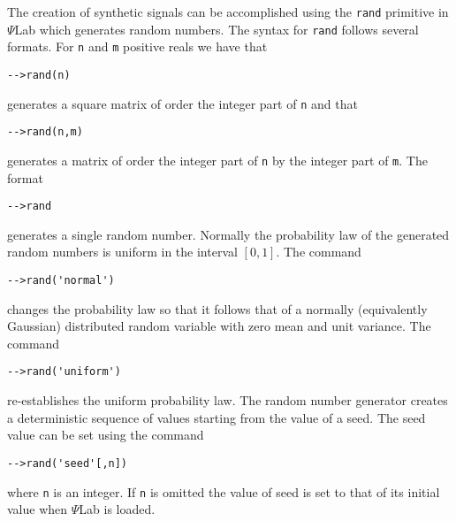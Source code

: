 	The creation of synthetic signals can be accomplished using
the {\tt rand} primitive in $\Psi$Lab which generates random numbers.  
The syntax for {\tt rand} follows
several formats. For {\tt n} and {\tt m} positive reals we have that
\begin{verbatim}
-->rand(n)
\end{verbatim}
generates a square matrix of order the integer part of {\tt n} and that
\begin{verbatim}
-->rand(n,m)
\end{verbatim}
generates a matrix of order the integer part of {\tt n} by the integer
part of {\tt m}.  The format
\begin{verbatim}
-->rand
\end{verbatim}
generates a single random number. Normally the probability law of
the generated random numbers is uniform in the interval $[0,1]$.
The command
\begin{verbatim}
-->rand('normal')
\end{verbatim}
changes the probability law so that it follows that of a normally
(equivalently Gaussian) distributed random variable with zero mean
and unit variance.  The command
\begin{verbatim}
-->rand('uniform')
\end{verbatim}
re-establishes the uniform probability law.  
The random number generator creates a deterministic sequence of values
starting from the value of a seed.  The seed value can be set using
the command
\begin{verbatim}
-->rand('seed'[,n])
\end{verbatim}
where {\tt n} is an integer.  If {\tt n} is omitted the value of
seed is set to that of its initial value when $\Psi$Lab is loaded.

